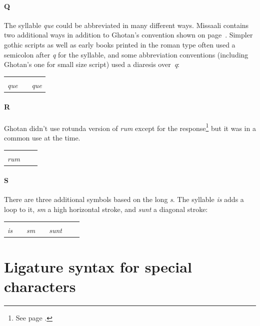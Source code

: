 \documentclass[a4paper, 12pt]{article}
\newcommand{\sample}[1]{{\mstexturafamily\fontsize{18}{18}\selectfont #1}}
\begin{document}
\paragraph{Q} The syllable \emph{que} could be abbreviated in many
different ways. Missaali contains two additional ways in addition to
Ghotan's convention shown on page~\pageref{pg_que}. Simpler gothic
scripts as well as early books printed in the roman type often used a
semicolon after \emph{q} for the syllable, and some abbreviation
conventions (including Ghotan's one for small size script) used a
diaresis over~\emph{q}:

\begin{center}
  \begin{tabular}{ccc}
    \sample{\msabbra{que}} & & \sample{\msabbra{qve}} \\
    \emph{que} & & \emph{que}
  \end{tabular}
\end{center}

\paragraph{R} Ghotan didn't use rotunda version of \emph{rum} except
for the response\footnote{See page \pageref{pg_response}.} but it was
in a common use at the time.  

\begin{center}
  \begin{tabular}{ccc}
    \sample{\msabbra{rum}}  \\
    \emph{rum}
  \end{tabular}
\end{center}

\paragraph{S} There are three additional symbols based on the long
\emph{s}. The syllable \emph{is} adds a loop to it, \emph{sm} a high
horizontal stroke, and \emph{sunt} a diagonal stroke:

\begin{center}
  \begin{tabular}{ccccccc}
    \sample{\msabbra{is}} & &
    \sample{\msabbra{sm}} & &
    \sample{\msabbra{sunt}} \\
    \emph{is} & &
    \emph{sm} & &
    \emph{sunt} 
  \end{tabular}
\end{center}


\section{Ligature syntax for special characters}\label{pg:ligatures_start}
\end{document}
